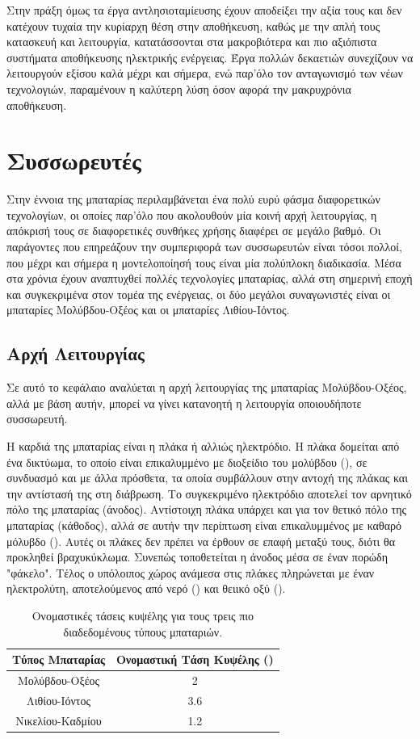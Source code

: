 \documentclass[12pt]{report}
\begin{document}
Στην πράξη όμως τα έργα αντλησιοταμίευσης έχουν αποδείξει την αξία τους και δεν κατέχουν τυχαία την κυρίαρχη θέση στην αποθήκευση, καθώς με την απλή τους κατασκευή και λειτουργία, 
κατατάσσονται στα μακροβιότερα και πιο αξιόπιστα συστήματα αποθήκευσης ηλεκτρικής ενέργειας. Έργα πολλών δεκαετιών συνεχίζουν να λειτουργούν εξίσου καλά μέχρι και σήμερα, ενώ παρ'όλο τον ανταγωνισμό των νέων τεχνολογιών,
παραμένουν η καλύτερη λύση όσον αφορά την μακρυχρόνια αποθήκευση.
\vfill

\section{Συσσωρευτές}
Στην έννοια της μπαταρίας περιλαμβάνεται ένα πολύ ευρύ φάσμα διαφορετικών τεχνολογίων, οι οποίες παρ'όλο που ακολουθούν μία κοινή αρχή λειτουργίας, η απόκρισή τους σε διαφορετικές συνθήκες χρήσης διαφέρει σε μεγάλο βαθμό. 
Οι παράγοντες που επηρεάζουν την συμπεριφορά των συσσωρευτών είναι τόσοι πολλοί, που μέχρι και σήμερα η μοντελοποίησή τους είναι μία πολύπλοκη διαδικασία. Μέσα στα χρόνια έχουν αναπτυχθεί πολλές τεχνολογίες μπαταρίας, 
αλλά στη σημερινή εποχή και συγκεκριμένα στον τομέα της ενέργειας, οι δύο μεγάλοι συναγωνιστές είναι οι μπαταρίες Μολύβδου-Οξέος και οι μπαταρίες Λιθίου-Ιόντος.
\subsection{Αρχή Λειτουργίας}
Σε αυτό το κεφάλαιο αναλύεται η αρχή λειτουργίας της μπαταρίας Μολύβδου-Οξέος, αλλά με βάση αυτήν, μπορεί να γίνει κατανοητή η λειτουργία οποιουδήποτε συσσωρευτή. 

Η καρδιά της μπαταρίας είναι η πλάκα ή αλλιώς ηλεκτρόδιο.
Η πλάκα δομείται από ένα δικτύωμα, το οποίο είναι επικαλυμμένο με διοξείδιο του μολύβδου ({}), σε συνδυασμό και με άλλα πρόσθετα, τα οποία συμβάλλουν στην αντοχή της πλάκας και την αντίστασή της στη διάβρωση. 
Το συγκεκριμένο ηλεκτρόδιο αποτελεί τον αρνητικό πόλο της μπαταρίας (άνοδος). Αντίστοιχη πλάκα υπάρχει και για τον θετικό πόλο της μπαταρίας (κάθοδος), 
αλλά σε αυτήν την περίπτωση είναι επικαλυμμένος με καθαρό μόλυβδο ({}). Αυτές οι πλάκες δεν πρέπει να 
έρθουν σε επαφή μεταξύ τους, διότι θα προκληθεί βραχυκύκλωμα. Συνεπώς τοποθετείται η άνοδος μέσα σε έναν πορώδη "φάκελο". 
Τέλος ο υπόλοιπος χώρος ανάμεσα στις πλάκες πληρώνεται με έναν ηλεκτρολύτη, αποτελούμενος από νερό ({}) και θειικό οξύ ({}).

\begin{table}[h]
\captionsetup{width=0.8\textwidth}
\caption{Ονομαστικές τάσεις κυψέλης για τους τρεις πιο διαδεδομένους τύπους μπαταριών.}
\centering
				\begin{tabular}{ |c|c| }
				\hline
				Tύπος Μπαταρίας & Ονομαστική Τάση Κυψέλης ({\latintext{V}}) \\
				\hline
				Μολύβδου-Οξέος & 2 \\
				\hline
				Λιθίου-Ιόντος & 3.6 \\
				\hline
				Νικελίου-Καδμίου & 1.2 \\
				\hline
				\end{tabular}
\label{tab:battery}
\end{table}
\end{document}
